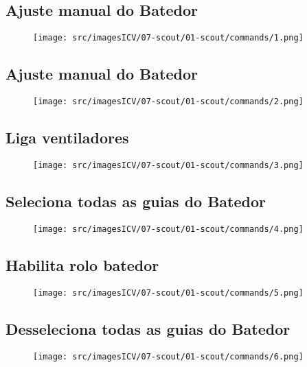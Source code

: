 
\thispagestyle{fancy}
\vspace{\fill}
\subsection{Ajuste manual do Batedor}
\begin{figure}
    \centering
    \texttt{[image: src/imagesICV/07-scout/01-scout/commands/1.png]}
\end{figure}
\newpage

\thispagestyle{fancy}
\vspace{\fill}
\subsection{Ajuste manual do Batedor}
\begin{figure}
    \centering
    \texttt{[image: src/imagesICV/07-scout/01-scout/commands/2.png]}
\end{figure}

\newpage
\thispagestyle{fancy}
\vspace{\fill}
\subsection{Liga ventiladores}
\begin{figure}
    \centering
    \texttt{[image: src/imagesICV/07-scout/01-scout/commands/3.png]}
\end{figure}

\newpage
\thispagestyle{fancy}
\vspace{\fill}
\subsection{Seleciona todas as guias do Batedor}
\begin{figure}
    \centering
    \texttt{[image: src/imagesICV/07-scout/01-scout/commands/4.png]}
\end{figure}

\newpage
\thispagestyle{fancy}
\vspace{\fill}
\subsection{Habilita rolo batedor}
\begin{figure}
    \centering
    \texttt{[image: src/imagesICV/07-scout/01-scout/commands/5.png]}
\end{figure}

\newpage
\thispagestyle{fancy}
\vspace{\fill}
\subsection{Desseleciona todas as guias do Batedor}
\begin{figure}
    \centering
    \texttt{[image: src/imagesICV/07-scout/01-scout/commands/6.png]}
\end{figure}

